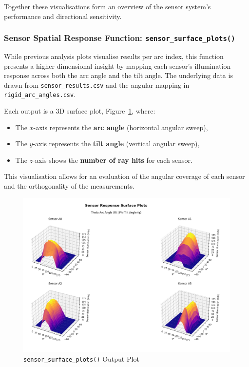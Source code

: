 \vspace{1em}
Together these visualisations form an overview of the sensor system's performance and directional sensitivity. 

\subsubsection{Sensor Spatial Response Function: \texttt{sensor\_surface\_plots()}}
While previous analysis plots visualise results per arc index, this function presents a higher-dimensional insight by mapping each sensor’s illumination response across both the arc angle and the tilt angle. The underlying data is drawn from \texttt{sensor\_results.csv} and the angular mapping in \texttt{rigid\_arc\_angles.csv}.

Each output is a 3D surface plot, Figure~\ref{fig:Sensor Surface Output Plot}, where:
\begin{itemize}
    \item The $x$-axis represents the \textbf{arc angle} (horizontal angular sweep),
    \item The $y$-axis represents the \textbf{tilt angle} (vertical angular sweep),
    \item The $z$-axis shows the \textbf{number of ray hits} for each sensor.
\end{itemize}
This visualisation allows for an evaluation of the angular coverage of each sensor and the orthogonality of the measurements.
\begin{landscape}
    \begin{figure}[p] %
        \centering
        \includegraphics[width=1\textwidth]{chapters/methodology/SoftwareModel/images/Sensor Surface Plots.png} %
        \caption{\texttt{sensor\_surface\_plots()} Output Plot}       %
        \label{fig:Sensor Surface Output Plot}            %
    \end{figure}
\end{landscape}

